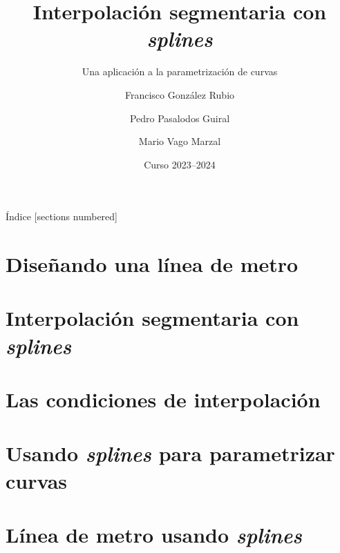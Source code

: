 \documentclass[10pt]{beamer}
\title{Interpolación segmentaria con \textit{splines}}
\subtitle{Una aplicación a la parametrización de curvas}
\author{Francisco González Rubio \and Pedro Pasalodos Guiral%
  \and Mario Vago Marzal}
\date{Curso 2023--2024}
\institute{Universitat de València}
\begin{document}
  {
    \vfuzz=16pt
    \maketitle
  }

  \begin{frame}{Índice}
    [sections numbered]
    \tableofcontents
  \end{frame}

  \section{Diseñando una línea de metro}
    

  \section{Interpolación segmentaria con \textit{splines}}
    

  \section{Las condiciones de interpolación}
    
    
    

  \section{Usando \textit{splines} para parametrizar curvas}
    
    

  \section{Línea de metro usando \textit{splines}}
    
\end{document}
